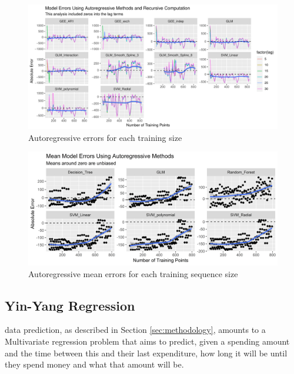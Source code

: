 \documentclass[11pt,a4paper]{article}
\begin{document}
\begin{figure}
	\centering
	\includegraphics[width=1\linewidth]{../figures/ar_errors_w_zeros}
	\caption{Autoregressive errors for each training size}
	\label{fig:arerrorswzeros}
\end{figure}

\begin{figure}
	\centering
	\includegraphics[width=1\linewidth]{../figures/ar_errors_w_zeros_means}
	\caption{Autoregressive mean errors for each training sequence size}
	\label{fig:arerrorswzerosmeans}
\end{figure}




\subsection{Yin-Yang Regression}
\yinyang data prediction, as described in Section \ref{sec:methodology}, amounts to a Multivariate regression problem that aims to predict, given a spending amount and the time between this and their last expenditure, how long it will be until they spend money and what that amount will be. 
\end{document}
